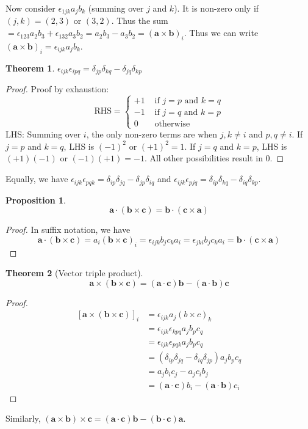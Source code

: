 \documentclass[a4paper]{article}
\theoremstyle{definition}
\newtheorem*{prop}{Proposition}
\newtheorem*{thm}{Theorem}
\newcommand{\mb}[1]{\mathbf{#1}}
\begin{document}
Now consider $\epsilon_{1jk}a_jb_k$ (summing over $j$ and $k$). It is non-zero only if $(j, k) = (2, 3)$ or $(3, 2)$. Thus the sum $= \epsilon_{123}a_2b_3 + \epsilon_{132}a_3b_2 = a_2b_3 - a_3b_2 = (\mb{a\times b})_i$. Thus we can write
$\mb{(a \times b)}_i = \epsilon_{ijk}a_jb_k$.
\begin{thm}
  $\epsilon_{ijk}\epsilon_{ipq} = \delta_{jp}\delta_{kq} - \delta_{jq}\delta_{kp}$
\end{thm}

\begin{proof}
Proof by exhaustion:
\[
\text{RHS} = \begin{cases}
  +1 &\text{ if } j = p \text{ and } k = q\\
  -1 &\text{ if } j = q \text{ and } k = p\\
  0 &\text{ otherwise}
\end{cases}
\]
LHS: Summing over $i$, the only non-zero terms are when $j, k\not=i$ and $p, q\not=i$. If $j = p$ and $k = q$, LHS is $(-1)^2$ or $(+1)^2 = 1$. If $j = q$ and $k = p$, LHS is $(+1)(-1)$ or $(-1)(+1) = -1$. All other possibilities result in 0.
\end{proof}
Equally, we have $\epsilon_{ijk}\epsilon_{pqk} = \delta_{ip}\delta_{jq} - \delta_{jp}\delta_{iq}$ and $\epsilon_{ijk}\epsilon_{pjq} = \delta_{ip}\delta_{kq} - \delta_{iq}\delta_{kp}$.

\begin{prop}
  \[
  \mb{a\cdot (b\times c) = b\cdot(c\times a)}
  \]
\end{prop}
\begin{proof}
  In suffix notation, we have
  \[
  \mb{a\cdot (b\times c)} = a_i\mb{(b\times c)}_i = \epsilon_{ijk}b_jc_ka_i = \epsilon_{jki}b_jc_ka_i = \mb{b\cdot (c\times a)}
  \]
\end{proof}

\begin{thm}[Vector triple product]
  \[
  \mb{a\times (b\times c) = (a\cdot c)b - (a\cdot b)c}
  \]
\end{thm}
\begin{proof}
  \begin{align*}
    \mb{[a\times(b\times c)]}_i &= \epsilon_{ijk} a_j(b\times c)_k \\
    &= \epsilon_{ijk}\epsilon_{kpq}a_jb_pc_q\\
    &= \epsilon_{ijk}\epsilon_{pqk} a_jb_pc_q\\
    &= (\delta_{ip}\delta_{jq}-\delta_{iq}\delta_{jp})a_jb_pc_q\\
    &= a_jb_ic_j - a_jc_ib_j\\
    &= \mb{(a\cdot c)}b_i - \mb{(a\cdot b)}c_i
  \end{align*}
\end{proof}
Similarly, $\mb{(a\times b)\times c = (a\cdot c)b - (b\cdot c)a}$.
\end{document}
